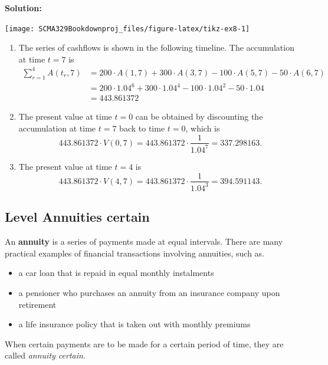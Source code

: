 \documentclass[
]{book}
\theoremstyle{definition}
\theoremstyle{definition}
\theoremstyle{definition}
\theoremstyle{definition}
\theoremstyle{remark}
\begin{document}
\textbf{Solution:}

\begin{center}\texttt{[image: SCMA329Bookdownproj\_files/figure-latex/tikz-ex8-1]} \end{center}

\begin{enumerate}
\def\labelenumi{\arabic{enumi}.}
\item
  The series of cashflows is shown in the following timeline. The
  accumulation at time \(t = 7\) is \[\begin{aligned}
      \sum_{r=1}^4 A(t_r,7) &= 200 \cdot A(1,7) +  300 \cdot A(3,7) -  100 \cdot A(5,7) -  50 \cdot A(6,7) \\
      &= 200 \cdot 1.04^6 + 300 \cdot 1.04^4 - 100 \cdot 1.04^2 - 50 \cdot 1.04 \\
      & = 443.861372\end{aligned}\]
\item
  The present value at time \(t = 0\) can be obtained by discounting the
  accumulation at time \(t = 7\) back to time \(t = 0\), which is
  \[443.861372  \cdot V(0,7) = 443.861372  \cdot \frac{1}{1.04^7} = 337.298163.\]
\item
  The present value at time \(t = 4\) is
  \[443.861372  \cdot V(4,7) = 443.861372  \cdot \frac{1}{1.04^3} = 394.591143.\]
\end{enumerate}

\hypertarget{level-annuities-certain}{%
\subsection{Level Annuities certain}\label{level-annuities-certain}}

An \textbf{annuity} is a series of payments made at equal intervals. There are many practical examples of financial transactions involving annuities, such as.

\begin{itemize}
\item
  a car loan that is repaid in equal monthly instalments
\item
  a pensioner who purchases an annuity from an insurance company upon retirement
\item
  a life insurance policy that is taken out with monthly premiums
\end{itemize}

When certain payments are to be made for a certain period of time, they are called \emph{annuity certain}.
\end{document}
